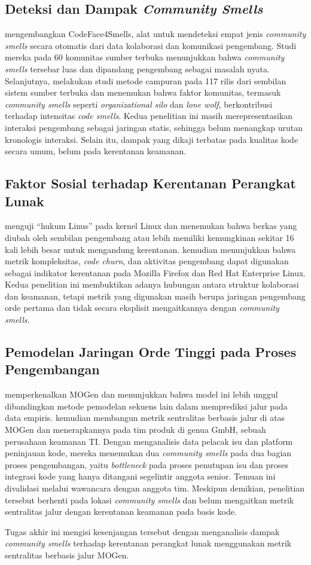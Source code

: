 \subsection{Deteksi dan Dampak \textit{Community Smells}}
\textcite{tamburri2021exploring} mengembangkan CodeFace4Smells, alat untuk mendeteksi empat jenis \textit{community smells} secara otomatis dari data kolaborasi dan komunikasi pengembang.
Studi mereka pada 60 komunitas sumber terbuka menunjukkan bahwa \textit{community smells} tersebar luas dan dipandang pengembang sebagai masalah nyata.
Selanjutnya, \textcite{palomba2018beyond} melakukan studi metode campuran pada 117 rilis dari sembilan sistem sumber terbuka dan menemukan bahwa faktor komunitas, termasuk \textit{community smells} seperti \textit{organizational silo} dan \textit{lone wolf}, berkontribusi terhadap intensitas \textit{code smells}.
Kedua penelitian ini masih merepresentasikan interaksi pengembang sebagai jaringan statis, sehingga belum menangkap urutan kronologis interaksi.
Selain itu, dampak yang dikaji terbatas pada kualitas kode secara umum, belum pada kerentanan keamanan.

\subsection{Faktor Sosial terhadap Kerentanan Perangkat Lunak}
\textcite{meneely2009secure} menguji ``hukum Linus'' pada kernel Linux dan menemukan bahwa berkas yang diubah oleh sembilan pengembang atau lebih memiliki kemungkinan sekitar 16 kali lebih besar untuk mengandung kerentanan.
\textcite{shin2011evaluating} kemudian menunjukkan bahwa metrik kompleksitas, \textit{code churn}, dan aktivitas pengembang dapat digunakan sebagai indikator kerentanan pada Mozilla Firefox dan Red Hat Enterprise Linux.
Kedua penelitian ini membuktikan adanya hubungan antara struktur kolaborasi dan keamanan, tetapi metrik yang digunakan masih berupa jaringan pengembang orde pertama dan tidak secara eksplisit mengaitkannya dengan \textit{community smells}.

\subsection{Pemodelan Jaringan Orde Tinggi pada Proses Pengembangan}
\textcite{gote2023mogen} memperkenalkan MOGen dan menunjukkan bahwa model ini lebih unggul dibandingkan metode pemodelan sekuens lain dalam memprediksi jalur pada data empiris.
\textcite{gote2023locating} kemudian membangun metrik sentralitas berbasis jalur di atas MOGen dan menerapkannya pada tim produk di genua GmbH, sebuah perusahaan keamanan TI.
Dengan menganalisis data pelacak isu dan platform peninjauan kode, mereka menemukan dua \textit{community smells} pada dua bagian proses pengembangan, yaitu \textit{bottleneck} pada proses penutupan isu dan proses integrasi kode yang hanya ditangani segelintir anggota senior.
Temuan ini divalidasi melalui wawancara dengan anggota tim.
Meskipun demikian, penelitian tersebut berhenti pada lokasi \textit{community smells} dan belum mengaitkan metrik sentralitas jalur dengan kerentanan keamanan pada basis kode.

Tugas akhir ini mengisi kesenjangan tersebut dengan menganalisis dampak \textit{community smells} terhadap kerentanan perangkat lunak menggunakan metrik sentralitas berbasis jalur MOGen.

